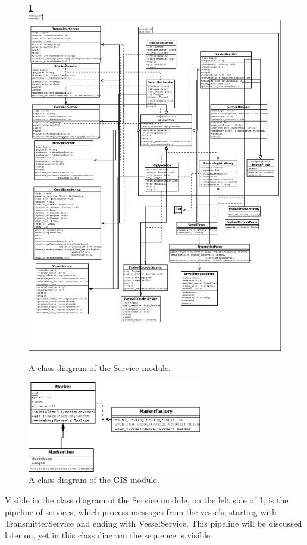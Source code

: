 \documentclass[12pt]{article}
\begin{document}
\begin{figure}
  \ref{lib_service_total}
  \centering
  \includegraphics[width=5in]{lib_service_total}
  \caption{A class diagram of the Service module.}
  \label{lib_service_total}
\end{figure}

\begin{figure}
  \centering
  \includegraphics[width=3in]{lib_gis_total}
  \caption{A class diagram of the GIS module.}
  \label{lib_gis_total}
\end{figure}

Visible in the class diagram of the Service module, on the left side of \ref{lib_service_total}, is the pipeline of services, which process messages from the vessels, starting with TransmitterService and ending with VesselService. This pipeline will be discussed later on, yet in this class diagram the sequence is visible.
\end{document}
